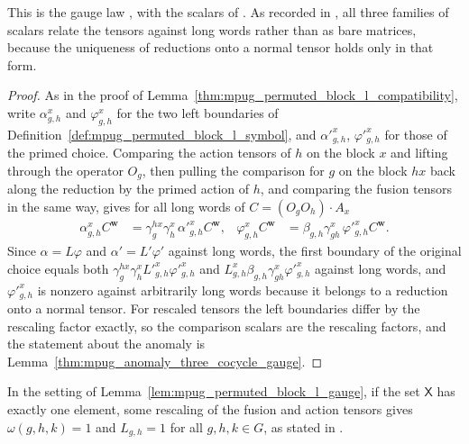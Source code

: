 \begin{lemma}
    This is the gauge law \cite[line~1918]{FrancoRubio2025MPUGauging}, with
    the scalars of
    \cite[lines~1500--1504, 1871--1873]{FrancoRubio2025MPUGauging}.
    As recorded in
    \cite{gap:fbc25_boundary_dressed_l_symbols}, all three families of scalars
    relate the tensors against long words rather than as bare matrices,
    because the uniqueness of reductions onto a normal tensor holds only in
    that form.
\end{lemma}

\begin{proof}\leanok
    As in the proof of Lemma~\ref{thm:mpug_permuted_block_l_compatibility},
    write $\alpha^x_{g,h}$ and $\varphi^x_{g,h}$ for the two left boundaries
    of Definition~\ref{def:mpug_permuted_block_l_symbol}, and
    $\alpha'^x_{g,h}$, $\varphi'^x_{g,h}$ for those of the primed choice.
    Comparing the action tensors of $h$ on the block $x$ and lifting through
    the operator $O_g$, then pulling the comparison for $g$ on the block $hx$
    back along the reduction by the primed action of $h$, and comparing the
    fusion tensors in the same way, gives for all long words of
    $C=(O_gO_h)\cdot A_x$
    \begin{align}
        \alpha^x_{g,h}C^{\mathbf w}
         & =\gamma^{hx}_g\gamma^x_h\,\alpha'^x_{g,h}C^{\mathbf w},   &
        \varphi^x_{g,h}C^{\mathbf w}
         & =\beta_{g,h}\gamma^x_{gh}\,\varphi'^x_{g,h}C^{\mathbf w}.
        \label{eq:mpug_permuted_l_gauge_boundaries}
    \end{align}
    Since $\alpha=L\varphi$ and $\alpha'=L'\varphi'$ against long words, the
    first boundary of the original choice equals both
    $\gamma^{hx}_g\gamma^x_hL'^x_{g,h}\varphi'^x_{g,h}$ and
    $L^x_{g,h}\beta_{g,h}\gamma^x_{gh}\varphi'^x_{g,h}$ against long words,
    and $\varphi'^x_{g,h}$ is nonzero against arbitrarily long words because
    it belongs to a reduction onto a normal tensor. For rescaled tensors the left boundaries
    differ by the rescaling factor exactly, so the comparison scalars are the
    rescaling factors, and the statement about the anomaly is
    Lemma~\ref{thm:mpug_anomaly_three_cocycle_gauge}.
\end{proof}

\begin{lemma}
    \label{lem:mpug_single_block_gauge_trivial}
    \leanok
    In the setting of Lemma~\ref{lem:mpug_permuted_block_l_gauge}, if the set
    $\mathsf X$ has exactly one element, some rescaling of the fusion and
    action tensors gives $\omega(g,h,k)=1$ and $L_{g,h}=1$ for all
    $g,h,k\in G$, as stated in
    \cite[lines~1925--1926]{FrancoRubio2025MPUGauging}.
\end{lemma}

